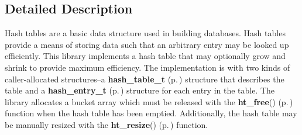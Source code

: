 

\subsection{Detailed Description}
Hash tables are a basic data structure used in building databases. Hash tables provide a means of storing data such that an arbitrary entry may be looked up efficiently. This library implements a hash table that may optionally grow and shrink to provide maximum efficiency. The implementation is with two kinds of caller-allocated structures--a {\bf hash\_\-table\_\-t} {\rm (p.\,\pageref{group__dbprim__hash_a0})} structure that describes the table and a {\bf hash\_\-entry\_\-t} {\rm (p.\,\pageref{group__dbprim__hash_a1})} structure for each entry in the table. The library allocates a bucket array which must be released with the {\bf ht\_\-free}() {\rm (p.\,\pageref{group__dbprim__hash_a14})} function when the hash table has been emptied. Additionally, the hash table may be manually resized with the {\bf ht\_\-resize}() {\rm (p.\,\pageref{group__dbprim__hash_a13})} function.

